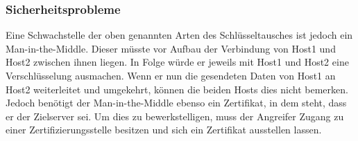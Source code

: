 \subsubsection{Sicherheitsprobleme}
Eine Schwachstelle der oben genannten Arten des Schlüsseltausches ist jedoch ein Man-in-the-Middle. Dieser müsste vor Aufbau der Verbindung von Host1 und Host2 zwischen ihnen liegen. In Folge würde er jeweils mit Host1 und Host2 eine Verschlüsselung ausmachen. Wenn er nun die gesendeten Daten von Host1 an Host2 weiterleitet und umgekehrt, können die beiden Hosts dies nicht bemerken.\\
Jedoch benötigt der Man-in-the-Middle ebenso ein Zertifikat, in dem steht, dass er der Zielserver sei. Um dies zu bewerkstelligen, muss der Angreifer Zugang zu einer Zertifizierungsstelle besitzen und sich ein Zertifikat ausstellen lassen.